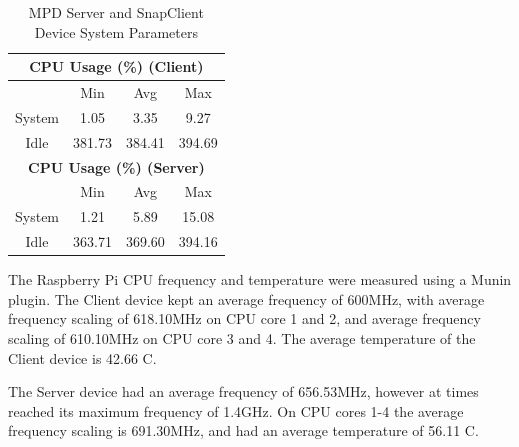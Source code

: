 \documentclass[11pt,a4paper,headinclude=false,footinclude=false]{scrreprt}
\begin{document}
\begin{table}[H]
\begin{tabular}{||c|c|c|c|c|c|c||}
    \multicolumn{7}{|c|}{\textbf{CPU Usage (\%) (Client)}} \\
    \hline\hline
      & \multicolumn{2}{|c|}{Min} & \multicolumn{2}{|c|}{Avg} & \multicolumn{2}{|c|}{Max} \\
    \hline
    System & \multicolumn{2}{|c|}{1.05} & \multicolumn{2}{|c|}{3.35} & \multicolumn{2}{|c|}{9.27} \\
    \hline
    Idle & \multicolumn{2}{|c|}{381.73} & \multicolumn{2}{|c|}{384.41} & \multicolumn{2}{|c|}{394.69} \\
    \hline\hline
    \multicolumn{7}{|c|}{\textbf{CPU Usage (\%) (Server)}} \\
    \hline\hline
      & \multicolumn{2}{|c|}{Min} & \multicolumn{2}{|c|}{Avg} & \multicolumn{2}{|c|}{Max} \\
    \hline
    System & \multicolumn{2}{|c|}{1.21} & \multicolumn{2}{|c|}{5.89} & \multicolumn{2}{|c|}{15.08} \\
    \hline
    Idle & \multicolumn{2}{|c|}{363.71} & \multicolumn{2}{|c|}{369.60} & \multicolumn{2}{|c|}{394.16} \\
    \hline\hline
    \end{tabular}
    \caption{MPD Server and SnapClient Device System Parameters}
    \label{MPDclientserverSysTab}
\end{table}

The Raspberry Pi CPU frequency and temperature were measured using a
Munin plugin. The Client device kept an average frequency of 600MHz,
with average frequency scaling of 618.10MHz on CPU core 1 and 2, and
average frequency scaling of 610.10MHz on CPU core 3 and 4. The average
temperature of the Client device is 42.66 \degree C.

The Server device had an average frequency of 656.53MHz, however at
times reached its maximum frequency of 1.4GHz. On CPU cores 1-4 the
average frequency scaling is 691.30MHz, and had an average temperature
of 56.11 \degree C.
\end{document}
